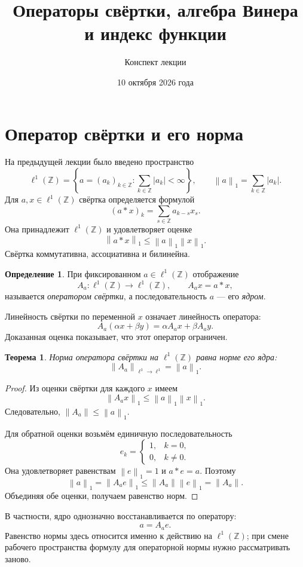 \documentclass[12pt,a4paper]{article}
\title{Операторы свёртки, алгебра Винера\\и индекс функции}
\author{Конспект лекции}
\date{10 октября 2026 года}
\newtheorem{theorem}{Теорема}
\theoremstyle{definition}
\newtheorem{definition}{Определение}
\theoremstyle{remark}
\newcommand{\ZZ}{\mathbb{Z}}
\newcommand{\norm}[1]{\left\lVert #1\right\rVert}
\begin{document}
\maketitle

\section{Оператор свёртки и его норма}

На предыдущей лекции было введено пространство
\[
  \ell^1(\ZZ)=\left\{a=(a_k)_{k\in\ZZ}:\sum_{k\in\ZZ}|a_k|<\infty\right\},
  \qquad \norm{a}_1=\sum_{k\in\ZZ}|a_k|.
\]
Для $a,x\in\ell^1(\ZZ)$ свёртка определяется формулой
\[
  (a*x)_k=\sum_{s\in\ZZ}a_{k-s}x_s.
\]
Она принадлежит $\ell^1(\ZZ)$ и удовлетворяет оценке
\[
  \norm{a*x}_1\leqslant\norm{a}_1\norm{x}_1.
\]
Свёртка коммутативна, ассоциативна и билинейна.

\begin{definition}
При фиксированном $a\in\ell^1(\ZZ)$ отображение
\[
  A_a\colon\ell^1(\ZZ)\longrightarrow\ell^1(\ZZ),\qquad A_ax=a*x,
\]
называется \emph{оператором свёртки}, а последовательность $a$ ---
его \emph{ядром}.
\end{definition}

Линейность свёртки по переменной $x$ означает линейность оператора:
\[
  A_a(\alpha x+\beta y)=\alpha A_ax+\beta A_ay.
\]
Доказанная оценка показывает, что этот оператор ограничен.

\begin{theorem}
Норма оператора свёртки на $\ell^1(\ZZ)$ равна норме его ядра:
\[
  \boxed{\norm{A_a}_{\ell^1\to\ell^1}=\norm{a}_1}.
\]
\end{theorem}

\begin{proof}
Из оценки свёртки для каждого $x$ имеем
\[
  \norm{A_ax}_1\leqslant\norm{a}_1\norm{x}_1.
\]
Следовательно, $\norm{A_a}\leqslant\norm{a}_1$.

Для обратной оценки возьмём единичную последовательность
\[
  e_k=\begin{cases}1,&k=0,\\0,&k\ne0.\end{cases}
\]
Она удовлетворяет равенствам $\norm{e}_1=1$ и $a*e=a$. Поэтому
\[
  \norm{a}_1=\norm{A_ae}_1
  \leqslant\norm{A_a}\norm{e}_1=\norm{A_a}.
\]
Объединяя обе оценки, получаем равенство норм.
\end{proof}

В частности, ядро однозначно восстанавливается по оператору:
\[
  \boxed{a=A_ae}.
\]
Равенство нормы здесь относится именно к действию на $\ell^1(\ZZ)$;
при смене рабочего пространства формулу для операторной нормы
нужно рассматривать заново.
\end{document}
